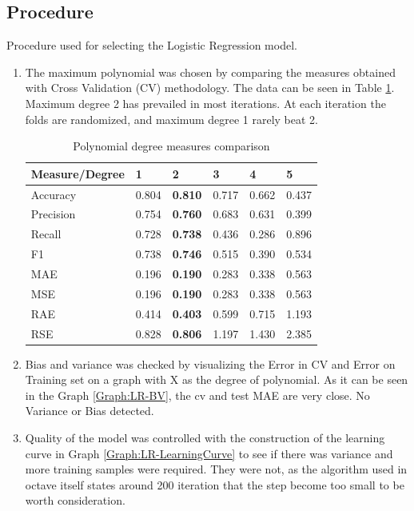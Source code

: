 \documentclass{article}
\begin{document}
\subsection{Procedure}

Procedure used for selecting the Logistic Regression model.

\begin{enumerate}  
\item The maximum polynomial was chosen by comparing the measures obtained with Cross Validation (CV) methodology. The data can be seen in Table
\ref{tab:LR-Measures}. Maximum degree 2 has prevailed in most iterations. At each iteration the folds are randomized, and maximum degree 1 rarely beat 2.

\begin{table}[]
\centering
\caption{Polynomial degree measures comparison}
\label{tab:LR-Measures}
\begin{tabular}{|l|l|l|l|l|l|}
\hline
Measure/Degree  & 1     & \textbf{2}     & 3     & 4     & 5     \\ \hline
Accuracy  		& 0.804 & \textbf{0.810} & 0.717 & 0.662 & 0.437 \\ \hline
Precision		& 0.754 & \textbf{0.760} & 0.683 & 0.631 & 0.399 \\ \hline
Recall    		& 0.728 & \textbf{0.738} & 0.436 & 0.286 & 0.896 \\ \hline
F1        		& 0.738 & \textbf{0.746} & 0.515 & 0.390 & 0.534 \\ \hline
MAE       		& 0.196 & \textbf{0.190} & 0.283 & 0.338 & 0.563 \\ \hline
MSE       		& 0.196 & \textbf{0.190} & 0.283 & 0.338 & 0.563 \\ \hline
RAE       		& 0.414 & \textbf{0.403} & 0.599 & 0.715 & 1.193 \\ \hline
RSE       		& 0.828 & \textbf{0.806} & 1.197 & 1.430 & 2.385 \\ \hline
\end{tabular}
\end{table}

\item Bias and variance was checked by visualizing the Error in CV and Error on Training set on a graph with X as the degree of polynomial. As it can be seen in the Graph \ref{Graph:LR-BV}, the cv and test MAE are very close. No Variance or Bias detected. 


\item Quality of the model was controlled with the construction of the learning curve in Graph \ref{Graph:LR-LearningCurve} to see if there was variance and more training samples were required. They were not, as the algorithm used in octave itself states around 200 iteration that the step become too small to be worth consideration.
\end{enumerate}
\end{document}
